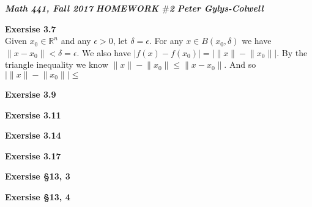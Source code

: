 \documentclass[12pt]{article}
\newenvironment{ques}[1]{\textbf{Exersise #1}\vspace{1 mm}\\ }{\bigskip}
\theoremstyle{definition}
\begin{document}
\noindent \textit{\textbf{Math 441, Fall 2017}} \hspace{1.3cm}
\textit{\textbf{HOMEWORK $\#$2}} \hspace{1.3cm} \textit{\textbf{Peter
Gylys-Colwell}} 

\vspace{1cm}

\begin{ques}{3.7}
	Given $x_0 \in \mathbb R^n$ and any $\epsilon > 0$, let $\delta =
	\epsilon$. For any $x \in B(x_0, \delta)$ we have $\lVert x
	- x_0 \rVert < \delta = \epsilon$. We also have $| f(x) - f(x_0)
	|= | \lVert x \rVert - \lVert x_0 \rVert |$. By the triangle inequality
	we know $\lVert x \rVert - \lVert x_0 \rVert \leq \lVert x - x_0
	\rVert$. And so $| \lVert x \rVert - \lVert x_0 \rVert | \leq $
\end{ques}

\begin{ques}{3.9}
\end{ques}

\begin{ques}{3.11}
\end{ques}

\begin{ques}{3.14}
\end{ques}

\begin{ques}{3.17}
\end{ques}

\begin{ques}{\S 13, 3}
\end{ques}

\begin{ques}{\S 13, 4}
\end{ques}
\end{document}
